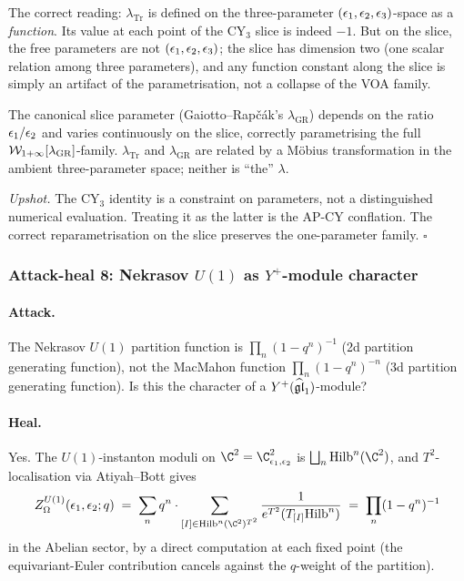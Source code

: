 The correct reading: $\lambda_{\mathrm{Tr}}$ is defined on the three-parameter
$(\epsilon_1, \epsilon_2, \epsilon_3)$-space as a \emph{function}. Its value at each point
of the CY$_3$ slice is indeed $-1$. But on the slice, the free parameters are
not $(\epsilon_1, \epsilon_2, \epsilon_3)$; the slice has dimension two (one scalar relation
among three parameters), and any function constant along the slice is simply
an artifact of the parametrisation, not a collapse of the VOA family.

The canonical slice parameter (Gaiotto--Rap\v c\'ak's $\lambda_{\mathrm{GR}}$)
depends on the ratio $\epsilon_1/\epsilon_2$ and varies continuously on the slice,
correctly parametrising the full $\mathcal{W}_{1+\infty}[\lambda_{\mathrm{GR}}]$-family.
$\lambda_{\mathrm{Tr}}$ and $\lambda_{\mathrm{GR}}$ are related by a M\"obius
transformation in the ambient three-parameter space; neither is ``the'' $\lambda$.

\emph{Upshot.} The CY$_3$ identity is a constraint on parameters, not a
distinguished numerical evaluation. Treating it as the latter is the AP-CY
conflation. The correct reparametrisation on the slice preserves the
one-parameter family.
\hfill$\square$

\subsubsection{Attack-heal 8: Nekrasov $U(1)$ as $Y^+$-module character}
\label{w17:subsubsec:ah8-nekrasov}

\paragraph{Attack.}
The Nekrasov $U(1)$ partition function is
$\prod_n (1 - q^n)^{-1}$ (2d partition generating function), not the MacMahon
function $\prod_n (1 - q^n)^{-n}$ (3d partition generating function).
Is this the character of a $Y^+(\widehat{\mathfrak{gl}}_1)$-module?

\paragraph{Heal.}
Yes. The $U(1)$-instanton moduli on $\C^2 = \C^2_{\eps_1, \eps_2}$ is
$\bigsqcup_n \Hilb^n(\C^2)$, and $T^2$-localisation via
Atiyah--Bott gives
\[
 Z^{U(1)}_\Omega(\eps_1, \eps_2; q)
 \;=\; \sum_n q^n \cdot \sum_{[I] \in \Hilb^n(\C^2)^{T^2}}
 \frac{1}{e^{T^2}(T_{[I]}\Hilb^n)}
 \;=\; \prod_n (1 - q^n)^{-1}
\]
in the Abelian sector, by a direct computation at each fixed point (the
equivariant-Euler contribution cancels against the $q$-weight of the partition).

